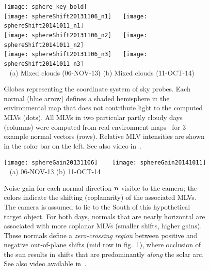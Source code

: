 \begin{figure}[t]
\centering
\hspace{3.1cm} \texttt{[image: sphere\_key\_bold]} \\[-1mm]
\texttt{[image: sphereShift20131106\_n1]} \ \ %
\texttt{[image: sphereShift20141011\_n1]} \\[3mm]
\texttt{[image: sphereShift20131106\_n2]} \ \ %
\texttt{[image: sphereShift20141011\_n2]} \\[3mm]
\texttt{[image: sphereShift20131106\_n3]} \ \ %
\texttt{[image: sphereShift20141011\_n3]} \\[2mm]
{\footnotesize {\verb| |} \hspace{0.5cm} (a) Mixed clouds (06-NOV-13) \hspace{0.25cm} (b) Mixed clouds (11-OCT-14) }\\
\caption[Examples of mean light vectors in function of the normal studied]{Globes representing the coordinate system of sky probes. Each normal (blue arrow) defines a shaded hemisphere in the environmental map that does not contribute light to the computed MLVs (dots). All MLVs in two particular partly cloudy days (columns) were computed from real environment maps~\cite{holdgeoffroy-iccp-15} for 3 example normal vectors (rows). Relative MLV intensities are shown in the color bar on the left. See also video in~\cite{webpageXhourPS}.}
\label{fig:realShiftNormal}
\end{figure}
\begin{figure}[!ht]
\centering
\texttt{[image: sphereGain20131106]} \ \ \ %
\texttt{[image: sphereGain20141011]} \\[1mm]
{\footnotesize {\verb| |} \hspace{.6cm} (a) 06-NOV-13 \hspace{1cm} (b) 11-OCT-14 }\\[3mm]
\caption[Noise gain over the sphere]{Noise gain for each normal direction ${\bf n}$ visible to the camera; the colors indicate the shifting (coplanarity) of the associated MLVs. The camera is assumed to lie to the South of this hypothetical target object. For both days, normals that are nearly horizontal are associated with more coplanar MLVs (smaller shifts, higher gains). These normals define a {\em zero-crossing region} between positive and negative out-of-plane shifts (mid row in fig.~\ref{fig:realShiftNormal}), where occlusion of the sun results in shifts that are predominantly {\em along} the solar arc. See also video available in~\cite{webpageXhourPS}.}
\label{fig:realShiftAll}
\end{figure}


